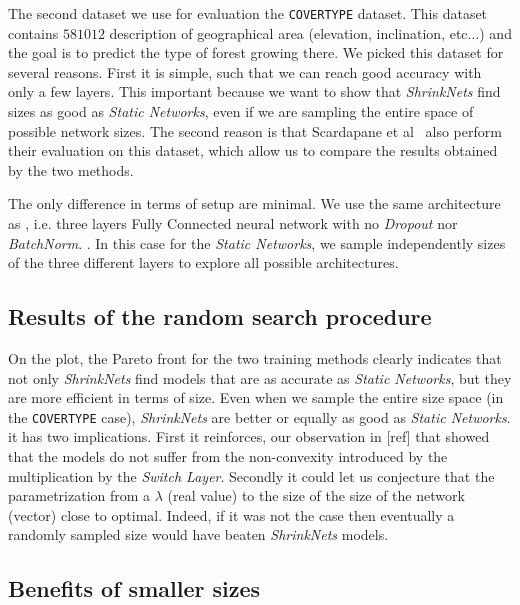 The second dataset we use for evaluation the \texttt{COVERTYPE} \cite{Blackard:1998:CNN:928509} dataset. This dataset
contains $581012$ description of geographical area (elevation, inclination,
etc...) and the goal is to predict the type of forest growing there. We picked
this dataset for several reasons. First it is simple, such that we can reach good
accuracy with only a few layers. This important because we want to show that
\textit{ShrinkNets} find sizes as good as \textit{Static Networks}, even if we
are sampling the entire space of possible network sizes. The second reason is that Scardapane et al~\cite{Scardapane2017}
also perform their evaluation on this dataset, which allow us to compare the
results obtained by the two methods. 

The only difference in terms of setup are minimal. We use the same architecture
as \cite{Scardapane2017}, i.e. three layers Fully Connected neural network with  no
\textit{Dropout} \cite{Srivastava2014} nor \textit{BatchNorm}. . In this case for the \textit{Static Networks}, we sample
independently sizes of the three different layers to explore all possible
architectures.

\subsection{Results of the random search procedure}

On the plot, the Pareto front for the two training methods clearly indicates
that not only \textit{ShrinkNets} find models that are as accurate as
\textit{Static Networks}, but they are more efficient in terms of size. Even
when we sample the entire size space (in the \texttt{COVERTYPE} case),
\textit{ShrinkNets} are better or equally as good as \textit{Static Networks}.
it has two implications. First it reinforces, our observation in [ref] that
showed that the models do not suffer from the non-convexity introduced by the
multiplication by the \textit{Switch Layer}. Secondly it could let us conjecture
that the parametrization from a $\lambda$ (real value) to the size of the
size of the network (vector) close to optimal. Indeed, if it was
not the case then eventually a randomly sampled size would have beaten
\textit{ShrinkNets} models. 

\subsection{Benefits of smaller sizes}

